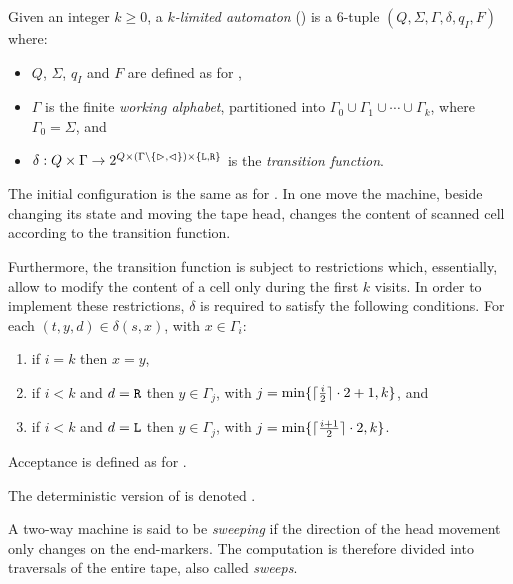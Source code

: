 \begin{defn}\label{def:kla}
	Given an integer $k\ge0$, a \emph{$k$-limited automaton} (\kLA) is a 6-tuple $(Q,\Sigma,\Gamma,\delta,q_I,F)$ where:
	\begin{itemize}
		\item $Q$, $\Sigma$, $q_I$ and $F$ are defined as for \TNFAs,
		\item $\Gamma$ is the finite \emph{working alphabet}, partitioned into $\Gamma_0\cup\Gamma_1\cup\cdots\cup\Gamma_k$, where $\Gamma_0=\Sigma$, and
		\item $\delta:Q\times\Gamma\to2^{Q\times(\Gamma\setminus\{\rhd,\lhd\})\times\{\mathtt L,\mathtt R\}}$ is the \emph{transition function}.
	\end{itemize}
	The initial configuration is the same as for \TNFAs.
	In one move the machine, beside changing its state and moving the tape head, changes the content of scanned cell according to the transition function.

	Furthermore, the transition function is subject to restrictions which, essentially, allow to modify the content of a cell only during the first $k$ visits.
	In order to implement these restrictions, $\delta$ is required to satisfy the following conditions. For each $(t,y,d)\in\delta(s,x)$, with $x\in\Gamma_i$:
	\begin{enumerate}[(1)]
		\item if $i=k$ then $x=y$,
		\item if $i<k$ and $d=\mathtt R$ then $y\in\Gamma_j$, with $j=\min\{\lceil \frac{i}{2} \rceil\cdot 2+1,k\}$, and
		\item if $i<k$ and $d=\mathtt L$ then $y\in\Gamma_j$, with $j=\min\{\lceil \frac{i+1}{2} \rceil\cdot 2,k\}$.
	\end{enumerate}

	\noindent Acceptance is defined as for \TNFAs.

	\noindent The deterministic version of \kLA is denoted \kDLA.
\end{defn}



\begin{defn}\label{def:sweeping}
	A two-way machine is said to be \emph{sweeping} if the direction of the head movement only changes on the end-markers.
	The computation is therefore divided into traversals of the entire tape, also called \emph{sweeps}.
\end{defn}
